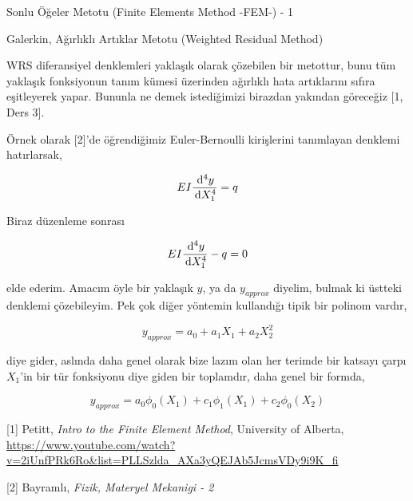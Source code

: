 \documentclass[12pt,fleqn]{article}\usepackage{../../common}
\begin{document}
Sonlu Öğeler Metotu (Finite Elements Method -FEM-) - 1

Galerkin, Ağırlıklı Artıklar Metotu (Weighted Residual Method)

WRS diferansiyel denklemleri yaklaşık olarak çözebilen bir metottur, bunu tüm
yaklaşık fonksiyonun tanım kümesi üzerinden ağırlıklı hata artıklarını sıfıra
eşitleyerek yapar. Bununla ne demek istediğimizi birazdan yakından göreceğiz
[1, Ders 3].

Örnek olarak [2]'de öğrendiğimiz Euler-Bernoulli kirişlerini tanımlayan denklemi
hatırlarsak,

$$
E I \frac{\,\mathrm{d}^4 y}{\,\mathrm{d} X_1^4} = q
$$

Biraz düzenleme sonrası

$$
E I \frac{\,\mathrm{d}^4 y}{\,\mathrm{d} X_1^4} - q = 0
$$

elde ederim. Amacım öyle bir yaklaşık $y$, ya da $y_{approx}$ diyelim, bulmak ki
üstteki denklemi çözebileyim. Pek çok diğer yöntemin kullandığı tipik bir
polinom vardır,

$$
y_{approx} = a_0 + a_1 X_1 + a_2 X_2^2 
$$

diye gider, aslında daha genel olarak bize lazım olan her terimde bir katsayı
çarpı $X_1$'in bir tür fonksiyonu diye giden bir toplamdır, daha genel bir
formda,

$$
y_{approx} = a_0 \phi_0(X_1) + c_1 \phi_1(X_1) + c_2 \phi_0(X_2) 
$$
















[1] Petitt, {\em Intro to the Finite Element Method}, University of Alberta,
    \url{https://www.youtube.com/watch?v=2iUnfPRk6Ro&list=PLLSzlda_AXa3yQEJAb5JcmsVDy9i9K_fi}

[2] Bayramlı, {\em Fizik, Materyel Mekanigi - 2}
    
\end{document}
